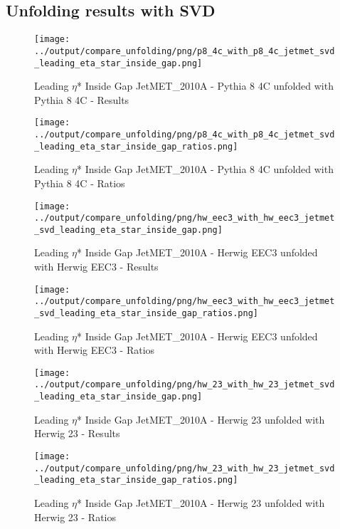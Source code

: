 \documentclass[11pt]{book}
\begin{document}
\clearpage
\subsection{Unfolding results with SVD}

\begin{figure}[ht]
\centering
\texttt{[image: ../output/compare\_unfolding/png/p8\_4c\_with\_p8\_4c\_jetmet\_svd\_leading\_eta\_star\_inside\_gap.png]}
\caption{Leading $\eta$* Inside Gap JetMET\_2010A - Pythia 8 4C unfolded with Pythia 8 4C - Results}
\label{p8_p8_jetmet_svd_leading_eta_star_inside_gap_a}
\end{figure}

\begin{figure}[ht]
\centering
\texttt{[image: ../output/compare\_unfolding/png/p8\_4c\_with\_p8\_4c\_jetmet\_svd\_leading\_eta\_star\_inside\_gap\_ratios.png]}
\caption{Leading $\eta$* Inside Gap JetMET\_2010A - Pythia 8 4C unfolded with Pythia 8 4C - Ratios}
\label{p8_p8_jetmet_svd_leading_eta_star_inside_gap_b}
\end{figure}

\begin{figure}[ht]
\centering
\texttt{[image: ../output/compare\_unfolding/png/hw\_eec3\_with\_hw\_eec3\_jetmet\_svd\_leading\_eta\_star\_inside\_gap.png]}
\caption{Leading $\eta$* Inside Gap JetMET\_2010A - Herwig EEC3 unfolded with Herwig EEC3 - Results}
\label{hw_eec3_hw_eec3_jetmet_svd_leading_eta_star_inside_gap_a}
\end{figure}

\begin{figure}[ht]
\centering
\texttt{[image: ../output/compare\_unfolding/png/hw\_eec3\_with\_hw\_eec3\_jetmet\_svd\_leading\_eta\_star\_inside\_gap\_ratios.png]}
\caption{Leading $\eta$* Inside Gap JetMET\_2010A - Herwig EEC3 unfolded with Herwig EEC3 - Ratios}
\label{hw_eec3_hw_eec3_jetmet_svd_leading_eta_star_inside_gap_b}
\end{figure}

\begin{figure}[ht]
\centering
\texttt{[image: ../output/compare\_unfolding/png/hw\_23\_with\_hw\_23\_jetmet\_svd\_leading\_eta\_star\_inside\_gap.png]}
\caption{Leading $\eta$* Inside Gap JetMET\_2010A - Herwig 23 unfolded with Herwig 23 - Results}
\label{hw_23_hw_23_jetmet_svd_leading_eta_star_inside_gap_a}
\end{figure}

\begin{figure}[ht]
\centering
\texttt{[image: ../output/compare\_unfolding/png/hw\_23\_with\_hw\_23\_jetmet\_svd\_leading\_eta\_star\_inside\_gap\_ratios.png]}
\caption{Leading $\eta$* Inside Gap JetMET\_2010A - Herwig 23 unfolded with Herwig 23 - Ratios}
\label{hw_23_hw_23_jetmet_svd_leading_eta_star_inside_gap_b}
\end{figure}
\end{document}
